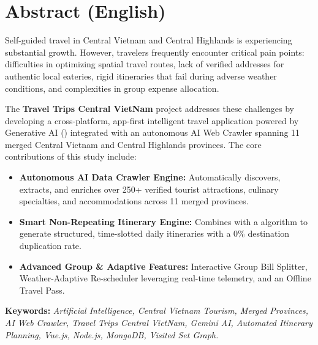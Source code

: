 \vspace{1cm}
\section*{Abstract (English)}
Self-guided travel in Central Vietnam and Central Highlands is experiencing substantial growth. However, travelers frequently encounter critical pain points: difficulties in optimizing spatial travel routes, lack of verified addresses for authentic local eateries, rigid itineraries that fail during adverse weather conditions, and complexities in group expense allocation.

The \textbf{Travel Trips Central VietNam} project addresses these challenges by developing a cross-platform, app-first intelligent travel application powered by Generative AI () integrated with an autonomous AI Web Crawler spanning 11 merged Central Vietnam and Central Highlands provinces. The core contributions of this study include:
\begin{itemize}
    \item \textbf{Autonomous AI Data Crawler Engine:} Automatically discovers, extracts, and enriches over 250+ verified tourist attractions, culinary specialties, and accommodations across 11 merged provinces.
    \item \textbf{Smart Non-Repeating Itinerary Engine:} Combines  with a  algorithm to generate structured, time-slotted daily itineraries with a 0\% destination duplication rate.
    \item \textbf{Advanced Group \& Adaptive Features:} Interactive Group Bill Splitter, Weather-Adaptive Re-scheduler leveraging real-time  telemetry, and an Offline Travel Pass.
\end{itemize}

\textbf{Keywords:} \textit{Artificial Intelligence, Central Vietnam Tourism, Merged Provinces, AI Web Crawler, Travel Trips Central VietNam, Gemini AI, Automated Itinerary Planning, Vue.js, Node.js, MongoDB, Visited Set Graph.}
